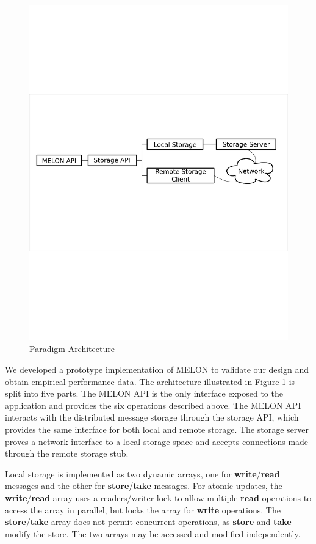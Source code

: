 \documentclass{llncs}
\begin{document}
\begin{figure}
\centering
\includegraphics[scale = .50, clip, trim = 10px 350px 10px 312px]{figures/paradigm_arch.pdf}
\caption{Paradigm Architecture}
\label{fig:architecture}
\end{figure}

We developed a prototype implementation of MELON to validate our design and obtain empirical performance data. The architecture illustrated in Figure \ref{fig:architecture} is split into five parts. The MELON API is the only interface exposed to the application and provides the six operations described above. The MELON API interacts with the distributed message storage through the storage API, which provides the same interface for both local and remote storage. The storage server proves a network interface to a local storage space and accepts connections made through the remote storage stub.

Local storage is implemented as two dynamic arrays, one for \textbf{write}/\textbf{read} messages and the other for \textbf{store}/\textbf{take} messages. For atomic updates, the \textbf{write}/\textbf{read} array uses a readers/writer lock to allow multiple \textbf{read} operations to access the array in parallel, but locks the array for \textbf{write} operations. The \textbf{store}/\textbf{take} array does not permit concurrent operations, as \textbf{store} and \textbf{take} modify the store. The two arrays may be accessed and modified independently.
\end{document}
